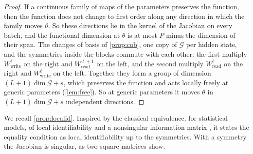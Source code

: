 \documentclass[10pt]{article}
\theoremstyle{definition}
\theoremstyle{remark}
\newcommand{\Wread}{W_{\mathrm{read}}}
\newcommand{\Wwrite}{W_{\mathrm{write}}}
\newcommand{\G}{\mathcal{G}}
\begin{document}
\begin{proof}
If a continuous family of maps of the parameters preserves the function, then the function does not change to first order along any direction in which the family moves $\theta$. So these directions lie in the kernel of the Jacobian on every batch, and the functional dimension at $\theta$ is at most $P$ minus the dimension of their span. The changes of basis of \cref{prop:cob}, one copy of $\G$ per hidden state, and the symmetries inside the blocks commute with each other: the first multiply $\Wwrite^{\ell}$ on the right and $\Wread^{\ell+1}$ on the left, and the second multiply $\Wread^{\ell}$ on the right and $\Wwrite^{\ell}$ on the left. Together they form a group of dimension $(L+1)\dim\G + s$, which preserves the function and acts locally freely at generic parameters (\cref{lem:free}). So at generic parameters it moves $\theta$ in $(L+1)\dim\G + s$ independent directions.
\end{proof}

We recall \cref{prop:localid}. Inspired by the classical equivalence, for statistical models, of local identifiability and a nonsingular information matrix \citep{rothenberg1971identification}, it states the equality condition as local identifiability up to the symmetries. With a symmetry the Jacobian is singular, as two square matrices show.
\end{document}
